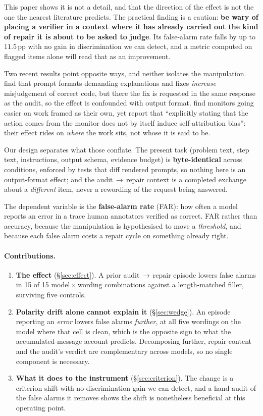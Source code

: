 \documentclass[11pt]{article}
\newcommand{\pp}{\,\text{pp}}
\begin{document}
This paper shows it is not a detail, and that the direction of the effect is not the one the nearest
literature predicts. The practical finding is a caution: \textbf{be wary of placing a verifier in a
context where it has already carried out the kind of repair it is about to be asked to judge}. Its
false-alarm rate falls by up to $11.5\pp$ with no gain in discrimination we can detect, and a metric
computed on flagged items alone will read that as an improvement.

Two recent results point opposite ways, and neither isolates the manipulation. \citet{jin2026} find
that prompt formats demanding explanations and fixes \emph{increase} misjudgement of correct code, but
there the fix is requested in the same response as the audit, so the effect is confounded with output
format. \citet{khullar2026} find monitors going easier on work framed as their own, yet report that
``explicitly stating that the action comes from the monitor does not by itself induce self-attribution
bias'': their effect rides on \emph{where} the work sits, not whose it is said to be.

Our design separates what those conflate. The present task (problem text, step text, instructions,
output schema, evidence budget) is \textbf{byte-identical} across conditions, enforced by tests that
diff rendered prompts, so nothing here is an output-format effect; and the audit\,$\to$\,repair context
is a completed exchange about a \emph{different} item, never a rewording of the request being answered.

The dependent variable is the \textbf{false-alarm rate} (FAR): how often a model reports an error in a
trace human annotators verified as correct. FAR rather than accuracy, because the manipulation is
hypothesised to move a \emph{threshold}, and because each false alarm costs a repair cycle on something
already right.

\paragraph{Contributions.}
\begin{enumerate}[topsep=2pt,itemsep=1pt,leftmargin=*]
\item \textbf{The effect} (\S\ref{sec:effect}). A prior audit\,$\to$\,repair episode lowers false
  alarms in 15 of 15 model\,$\times$\,wording combinations against a length-matched filler, surviving
  five controls.
\item \textbf{Polarity drift alone cannot explain it} (\S\ref{sec:wedge}). An episode reporting an \emph{error}
  lowers false alarms \emph{further}, at all five wordings on the model where that cell is clean,
  which is the opposite sign to what the accumulated-message account predicts. Decomposing further,
  repair content and the audit's verdict are complementary across models, so no single component is
  necessary.
\item \textbf{What it does to the instrument} (\S\ref{sec:criterion}). The change is a criterion shift
  with no discrimination gain we can detect, and a hand audit of the false alarms it removes shows the
  shift is nonetheless beneficial at this operating point.
\end{enumerate}
\end{document}
